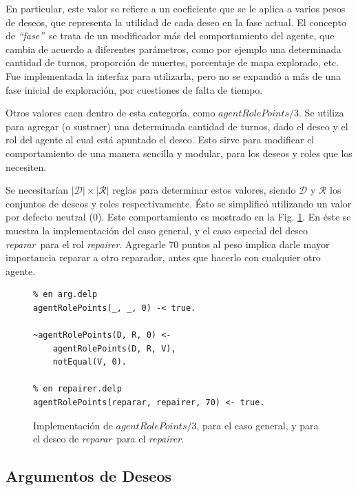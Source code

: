 \documentclass[oneside]{book}
\theoremstyle{definition}
\theoremstyle{example}
\newcommand{\lit}[1]{\mbox{$ #1$}}
\begin{document}
En particular, este valor se refiere a un coeficiente que se le aplica a varios
pesos de deseos, que representa la utilidad de cada deseo en la fase actual. El 
concepto de \textit{``fase''}\ se trata de un modificador más del comportamiento
del agente, que cambia de acuerdo a diferentes parámetros, como por ejemplo una
determinada cantidad de turnos, proporción de muertes, porcentaje de mapa explorado,
etc. Fue implementada la interfaz para utilizarla, pero no se expandió a más de una
fase inicial de exploración, por cuestiones de falta de tiempo.

Otros valores caen dentro de esta categoría, como \lit{agentRolePoints/3}.
Se utiliza para agregar (o sustraer) una determinada cantidad de turnos, dado el
deseo y el rol del agente al cual está apuntado el deseo. Esto sirve para modificar el 
comportamiento de una manera sencilla y modular, para los deseos y roles que los 
necesiten.

Se necesitarían $|{\mathcal D}| \times |{\mathcal R}|$ reglas para determinar 
estos valores, siendo $\mathcal D$ y $\mathcal R$ los conjuntos de deseos y 
roles respectivamente. Ésto se simplificó utilizando un valor por defecto 
neutral ($0$). Este comportamiento es mostrado en la Fig. 
\ref{fig:agentRolePoints}. En éste se muestra la implementación del caso 
general, y el caso especial del deseo \emph{reparar}\ para el rol 
\emph{repairer}. Agregarle 70 puntos al peso implica darle mayor importancia 
reparar a otro reparador, antes que hacerlo con cualquier otro agente.

\begin{figure}
\begin{verbatim}
% en arg.delp
agentRolePoints(_, _, 0) -< true.
	
~agentRolePoints(D, R, 0) <- 
	agentRolePoints(D, R, V),
	notEqual(V, 0).
    
% en repairer.delp
agentRolePoints(reparar, repairer, 70) <- true.
\end{verbatim}
\caption{Implementación de \lit{agentRolePoints/3}, para el caso general, y para el 
deseo de \emph{reparar}\ para el \emph{repairer}.}
\label{fig:agentRolePoints}
\end{figure}


\subsection{Argumentos de Deseos}

\label{sec:argumentosDeseos}
\end{document}
